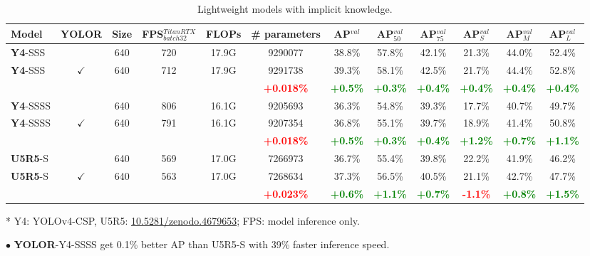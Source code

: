 \documentclass[10pt,twocolumn,letterpaper]{article}
\begin{document}
\begin{table*}[t]
	\centering
	\begin{threeparttable}[t]
		\footnotesize
		\caption{Lightweight models with implicit knowledge.}
		\label{table:small}
		\setlength\tabcolsep{4.5pt}
		\begin{tabular}{lccccccccccc}
			\toprule
			\textbf{Model} & \textbf{YOLOR} & \textbf{Size} & \textbf{FPS$^{TitanRTX}_{batch 32}$} & \textbf{FLOPs} & \textbf{\# parameters} & \textbf{AP$^{val}$} & \textbf{AP$^{val}_{50}$} & \textbf{AP$^{val}_{75}$} & \textbf{AP$^{val}_{S}$} & \textbf{AP$^{val}_{M}$} & \textbf{AP$^{val}_{L}$} \\				
			\midrule
			\textbf{Y4}-SSS &  & 640 & 720 & 17.9G & 9290077 & 38.8\% & 57.8\% & 42.1\% & 21.3\% & 44.0\% & 52.4\% \\
			\textbf{Y4}-SSS & $\checkmark$ & 640 & 712 & 17.9G & 9291738 & 39.3\% & 58.1\% & 42.5\% & 21.7\% & 44.4\% & 52.8\% \\
			&  &  &  &  & \textbf{\textcolor{red}{+0.018\%}} & \textbf{\textcolor{green}{+0.5\%}} & \textbf{\textcolor{green}{+0.3\%}} & \textbf{\textcolor{green}{+0.4\%}} & \textbf{\textcolor{green}{+0.4\%}} & \textbf{\textcolor{green}{+0.4\%}} & \textbf{\textcolor{green}{+0.4\%}} \\
			\midrule
			\textbf{Y4}-SSSS &  & 640 & 806 & 16.1G & 9205693 & 36.3\% & 54.8\% & 39.3\% & 17.7\% & 40.7\% & 49.7\% \\
			\textbf{Y4}-SSSS & $\checkmark$ & 640 & 791 & 16.1G & 9207354 & 36.8\% & 55.1\% & 39.7\% & 18.9\% & 41.4\% & 50.8\% \\
			&  &  &  &  & \textbf{\textcolor{red}{+0.018\%}} & \textbf{\textcolor{green}{+0.5\%}} & \textbf{\textcolor{green}{+0.3\%}} & \textbf{\textcolor{green}{+0.4\%}} & \textbf{\textcolor{green}{+1.2\%}} & \textbf{\textcolor{green}{+0.7\%}} & \textbf{\textcolor{green}{+1.1\%}} \\
			\midrule
			\textbf{U5R5}-S &  & 640 & 569 & 17.0G & 7266973 & 36.7\% & 55.4\% & 39.8\% & 22.2\% & 41.9\% & 46.2\% \\
			\textbf{U5R5}-S & $\checkmark$ & 640 & 563 & 17.0G & 7268634 & 37.3\% & 56.5\% & 40.5\% & 21.1\% & 42.7\% & 47.7\% \\
			&  &  &  &  & \textbf{\textcolor{red}{+0.023\%}} & \textbf{\textcolor{green}{+0.6\%}} & \textbf{\textcolor{green}{+1.1\%}} & \textbf{\textcolor{green}{+0.7\%}} & \textbf{\textcolor{red}{-1.1\%}} & \textbf{\textcolor{green}{+0.8\%}} & \textbf{\textcolor{green}{+1.5\%}} \\				
			\bottomrule
		\end{tabular}
		\begin{tablenotes}[flushleft]
			\footnotesize
			\item[*] Y4: YOLOv4-CSP, U5R5: \url{10.5281/zenodo.4679653}; FPS: model inference only.
			\item[$\bullet$] \textbf{YOLOR}-Y4-SSSS get 0.1\% better AP than U5R5-S with 39\% faster inference speed.
		\end{tablenotes}
	\end{threeparttable}
\end{table*}
\end{document}
